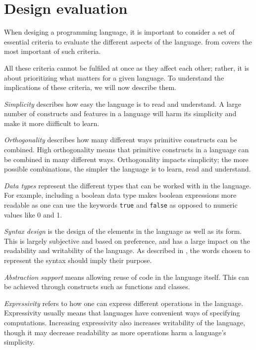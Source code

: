 \section{Design evaluation} \label{chap:design evaluation}
When desiging a programming language, it is important to consider a set of essential criteria to evaluate the different aspects of the language.
 from \cite{sebesta_concepts_2016} covers the most important of such criteria.


All these criteria cannot be fulfiled at once as they affect each other; rather, it is about prioritizing what matters for a given language. 
To understand the implications of these criteria, we will now describe them.

\textit{Simplicity} describes how easy the language is to read and understand. 
A large number of constructs and features in a language will harm its simplicity and make it more diifficult to learn.

\textit{Orthogonality} describes how many different ways primitive constructs can be combined. 
High orthogonality means that primitive constructs in a language can be combined in many different ways. 
Orthogonality impacts simplicity; the more possible combinations, the simpler the language is to learn, read and understand.

\textit{Data types} represent the different types that can be worked with in the language. 
For example, including a boolean data type makes boolean expressions more readable as one can use the keywords \texttt{true} and \texttt{false} as opposed to numeric values like 0 and 1. 

\textit{Syntax design} is the design of the elements in the language as well as its form. 
This is largely subjective and based on preference, and has a large impact on the readability and writability of the language. 
As described in , the words chosen to represent the syntax should imply their purpose.

\textit{Abstraction support} means allowing reuse of code in the language itself. 
This can be achieved through constructs such as functions and classes.

\textit{Expressivity} refers to how one can express different operations in the language.
Expressivity usually means that languages have convenient ways of specifying computations. 
Increasing expressivity also increases writability of the language, though it may decrease readability as more operations harm a language's simplicity.
 
